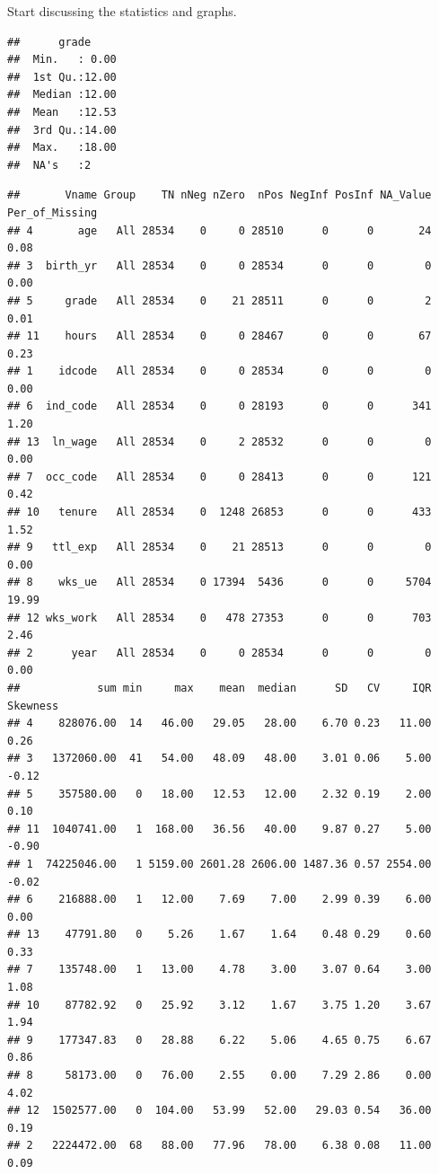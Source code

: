 \documentclass[
]{article}
\begin{document}
Start discussing the statistics and graphs.

\begin{verbatim}
##      grade      
##  Min.   : 0.00  
##  1st Qu.:12.00  
##  Median :12.00  
##  Mean   :12.53  
##  3rd Qu.:14.00  
##  Max.   :18.00  
##  NA's   :2
\end{verbatim}

\begin{verbatim}
##       Vname Group    TN nNeg nZero  nPos NegInf PosInf NA_Value Per_of_Missing
## 4       age   All 28534    0     0 28510      0      0       24           0.08
## 3  birth_yr   All 28534    0     0 28534      0      0        0           0.00
## 5     grade   All 28534    0    21 28511      0      0        2           0.01
## 11    hours   All 28534    0     0 28467      0      0       67           0.23
## 1    idcode   All 28534    0     0 28534      0      0        0           0.00
## 6  ind_code   All 28534    0     0 28193      0      0      341           1.20
## 13  ln_wage   All 28534    0     2 28532      0      0        0           0.00
## 7  occ_code   All 28534    0     0 28413      0      0      121           0.42
## 10   tenure   All 28534    0  1248 26853      0      0      433           1.52
## 9   ttl_exp   All 28534    0    21 28513      0      0        0           0.00
## 8    wks_ue   All 28534    0 17394  5436      0      0     5704          19.99
## 12 wks_work   All 28534    0   478 27353      0      0      703           2.46
## 2      year   All 28534    0     0 28534      0      0        0           0.00
##            sum min     max    mean  median      SD   CV     IQR Skewness
## 4    828076.00  14   46.00   29.05   28.00    6.70 0.23   11.00     0.26
## 3   1372060.00  41   54.00   48.09   48.00    3.01 0.06    5.00    -0.12
## 5    357580.00   0   18.00   12.53   12.00    2.32 0.19    2.00     0.10
## 11  1040741.00   1  168.00   36.56   40.00    9.87 0.27    5.00    -0.90
## 1  74225046.00   1 5159.00 2601.28 2606.00 1487.36 0.57 2554.00    -0.02
## 6    216888.00   1   12.00    7.69    7.00    2.99 0.39    6.00     0.00
## 13    47791.80   0    5.26    1.67    1.64    0.48 0.29    0.60     0.33
## 7    135748.00   1   13.00    4.78    3.00    3.07 0.64    3.00     1.08
## 10    87782.92   0   25.92    3.12    1.67    3.75 1.20    3.67     1.94
## 9    177347.83   0   28.88    6.22    5.06    4.65 0.75    6.67     0.86
## 8     58173.00   0   76.00    2.55    0.00    7.29 2.86    0.00     4.02
## 12  1502577.00   0  104.00   53.99   52.00   29.03 0.54   36.00     0.19
## 2   2224472.00  68   88.00   77.96   78.00    6.38 0.08   11.00     0.09

\end{verbatim}
\end{document}

